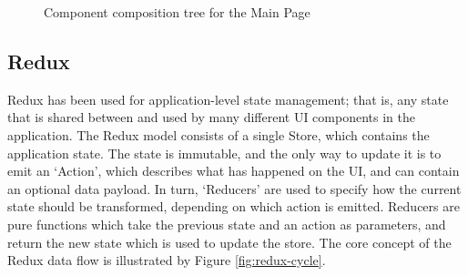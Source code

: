 \begin{figure}[h!]
  \begin{center}
    \caption{Component composition tree for the Main Page}
    \label{fig:main-components}
  \end{center}
\end{figure}

\subsection{Redux}
Redux has been used for application-level state management; that is, any state that is shared between and used by many different UI components in the application. The Redux model consists of a single Store, which contains the application state. The state is immutable, and the only way to update it is to emit an `Action', which describes what has happened on the UI, and can contain an optional data payload. In turn, `Reducers' are used to specify how the current state should be transformed, depending on which action is emitted. Reducers are pure functions which take the previous state and an action as parameters, and return the new state which is used to update the store. The core concept of the Redux data flow is illustrated by Figure \ref{fig:redux-cycle}.

